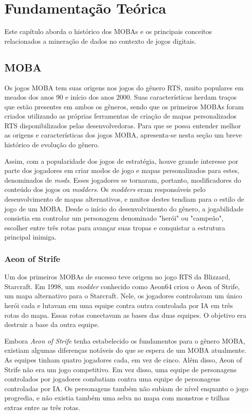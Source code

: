\chapter{Fundamentação Teórica}

Este capítulo aborda o histórico dos MOBAs e os principais conceitos relacionados a mineração de dados no contexto de jogos digitais.

\section{MOBA}
Os jogos MOBA tem suas origens nos jogos do gênero RTS, muito populares em meados dos anos 90 e início dos anos 2000. Suas características herdam traços que estão presentes em ambos os gêneros, sendo que os primeiros MOBAs foram criados utilizando as próprias ferramentas de criação de mapas personalizados RTS disponibilizados pelas desenvolvedoras. Para que se possa entender melhor as origens e características dos jogos MOBA, apresenta-se nesta seção um breve histórico de evolução do gênero.

Assim, com a popularidade dos jogos de estratégia, houve grande interesse por parte dos jogadores em criar modos de jogo e mapas personalizados para estes, denominados de \textit{mods}. Esses jogadores se tornaram, portanto, modificadores do conteúdo dos jogos ou \textit{modders}. Os \textit{modders} eram responsáveis pelo desenvolvimento de mapas alternativos, e muitos destes tendiam para o estilo de jogo de um MOBA. Desde o início do desenvolvimento do gênero, a jogabilidade consistia em controlar um personagem denominado "herói" ou "campeão", escolher entre três rotas para avançar suas tropas e conquistar a estrutura principal inimiga.

\subsection{Aeon of Strife}
Um dos primeiros MOBAs de sucesso teve origem no jogo RTS da Blizzard, Starcraft. Em 1998, um \textit{modder} conhecido como Aeon64 criou o Aeon of Strife, um mapa alternativo para o Starcraft. Nele, os jogadores controlavam um único herói cada e lutavam em uma equipe contra outra controlada por IA em três rotas do mapa. Essas rotas conectavam as bases das duas equipes. O objetivo era destruir a base da outra equipe.

Embora \textit{Aeon of Strife} tenha estabelecido os fundamentos para o gênero MOBA, existiam algumas diferenças notáveis do que se espera de um MOBA atualmente. As equipes tinham quatro jogadores cada, em vez de cinco. Além disso, Aeon of Strife não era um jogo competitivo. Em vez disso, uma equipe de personagens controlados por jogadores combatiam contra uma equipe de personagens controladas por IA. Os personagens também não subiam de nível enquanto o jogo progredia, e não existia também uma selva no mapa com monstros e trilhas extras entre as três rotas.

